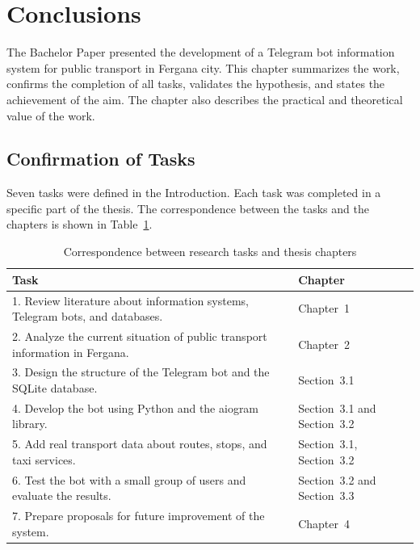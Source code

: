 \chapter*{Conclusions}
\label{ch:conclusions}

The Bachelor Paper presented the development of a Telegram bot information
system for public transport in Fergana city. This chapter summarizes the
work, confirms the completion of all tasks, validates the hypothesis, and
states the achievement of the aim. The chapter also describes the practical
and theoretical value of the work.

\section*{Confirmation of Tasks}

Seven tasks were defined in the Introduction. Each task was completed in a
specific part of the thesis. The correspondence between the tasks and the
chapters is shown in Table~\ref{tab:tasks-conclusion}.

\begin{table}[h]
\centering
\caption{Correspondence between research tasks and thesis chapters}
\label{tab:tasks-conclusion}
\begin{tabular}{p{}l}
\hline
\textbf{Task} & \textbf{Chapter} \\
\hline
1. Review literature about information systems, Telegram bots, and
databases. & Chapter~1 \\
2. Analyze the current situation of public transport information in
Fergana. & Chapter~2 \\
3. Design the structure of the Telegram bot and the SQLite database. &
Section~3.1 \\
4. Develop the bot using Python and the aiogram library. & Section~3.1
and Section~3.2 \\
5. Add real transport data about routes, stops, and taxi services. &
Section~3.1, Section~3.2 \\
6. Test the bot with a small group of users and evaluate the results. &
Section~3.2 and Section~3.3 \\
7. Prepare proposals for future improvement of the system. & Chapter~4 \\
\hline
\end{tabular}
\end{table}

